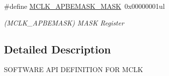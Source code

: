 \begin{DoxyCompactItemize}
\item 
\hypertarget{group___s_a_m_l21___m_c_l_k_ga694a5d6189623d9209e267eae49ddb58}{}\#define \hyperlink{group___s_a_m_l21___m_c_l_k_ga694a5d6189623d9209e267eae49ddb58}{M\+C\+L\+K\+\_\+\+A\+P\+B\+E\+M\+A\+S\+K\+\_\+\+M\+A\+S\+K}~0x00000001ul\label{group___s_a_m_l21___m_c_l_k_ga694a5d6189623d9209e267eae49ddb58}

\begin{DoxyCompactList}\small\item\em (M\+C\+L\+K\+\_\+\+A\+P\+B\+E\+M\+A\+S\+K) M\+A\+S\+K Register \end{DoxyCompactList}\end{DoxyCompactItemize}


\subsection{Detailed Description}
S\+O\+F\+T\+W\+A\+R\+E A\+P\+I D\+E\+F\+I\+N\+I\+T\+I\+O\+N F\+O\+R M\+C\+L\+K 